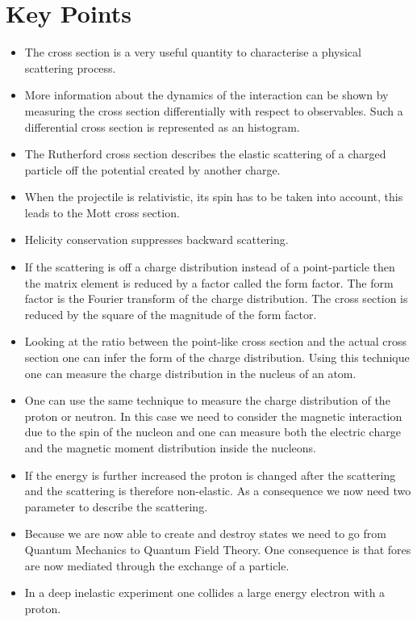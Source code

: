 \documentclass[12pt]{article}
\begin{document}
\section{Key Points}
\begin{itemize}
\item The cross section is a very useful quantity to characterise a physical scattering process.
\item More information about the dynamics of the interaction can be shown by measuring the cross section differentially with respect to observables. Such a differential cross section is represented as an histogram.
\item The Rutherford cross section describes the elastic scattering of a charged particle off the potential created by another charge.
\item When the projectile is relativistic, its spin has to be taken into account, this leads to the Mott cross section.
\item Helicity conservation suppresses backward scattering.
\item If the scattering is off a charge distribution instead of a point-particle then the matrix element is reduced by a factor called the form factor. The form factor is the Fourier transform of the charge distribution. The cross section is reduced by the square of the magnitude of the form factor.
\item Looking at the ratio between the point-like cross section and the actual cross section one can infer the form of the charge distribution. Using this technique one can measure the charge distribution in the nucleus of an atom.
\item One can use the same technique to measure the charge distribution of the proton or neutron. In this case we need to consider the magnetic interaction due to the spin of the nucleon and one can measure both the electric charge and the magnetic moment distribution inside the nucleons.
\item If the energy is further increased the proton is changed after the scattering and the scattering is therefore non-elastic. As a consequence we now need two parameter to describe the scattering. 
\item Because we are now able to create and destroy states we need to go from Quantum Mechanics to Quantum Field Theory. One consequence is that fores are now mediated through the exchange of a particle.
\item In a deep inelastic experiment one collides a large energy electron with a proton.

\end{itemize}
\end{document}

